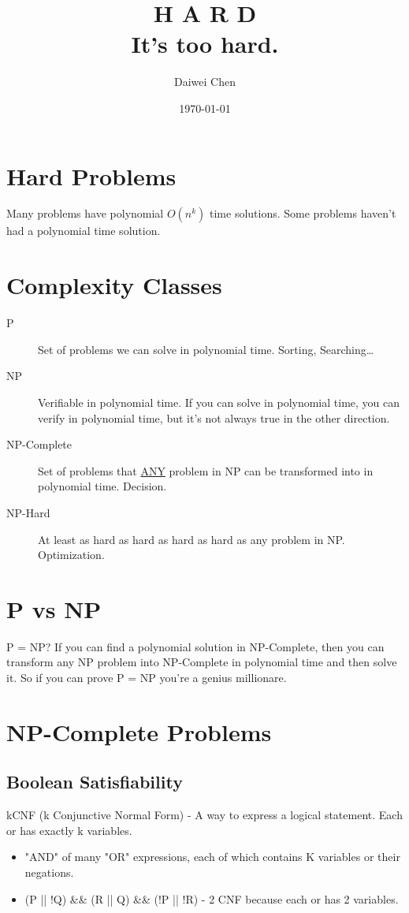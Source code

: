 \documentclass{article}
\author{Daiwei Chen}
\date{\today}
\title{\textbf{H A R D}\\\medskip
\large It's too hard.}
\begin{document}
\maketitle
\tableofcontents


\section{Hard Problems}
\label{sec:org871fb4e}
Many problems have polynomial \(O(n^k)\) time solutions.
Some problems haven't had a polynomial time solution.

\section{Complexity Classes}
\label{sec:org1a74758}
\begin{description}
\item[{P}] Set of problems we can solve in polynomial time. Sorting, Searching\ldots{}
\item[{NP}] Verifiable in polynomial time. If you can solve in polynomial time, you can verify in polynomial time, but it's not always true in the other direction.
\item[{NP-Complete}] Set of problems that \uline{ANY} problem in NP can be transformed into in polynomial time. Decision.
\item[{NP-Hard}] At least as hard as hard as hard as hard as any problem in NP. Optimization.
\end{description}

\section{P vs NP}
\label{sec:org1215151}
P = NP? If you can find a polynomial solution in NP-Complete, then you can transform any NP problem into NP-Complete in polynomial time and then solve it. So if you can prove P = NP you're a genius millionare.

\section{NP-Complete Problems}
\label{sec:orgd05025c}
\subsection{Boolean Satisfiability}
\label{sec:org32408b4}
kCNF (k Conjunctive Normal Form) - A way to express a logical statement. Each or has exactly k variables.
\begin{itemize}
\item "AND" of many "OR" expressions, each of which contains K variables or their negations.
\item (P || !Q) \&\& (R || Q) \&\& (!P || !R) - 2 CNF because each or has 2 variables.
\end{itemize}
\end{document}
